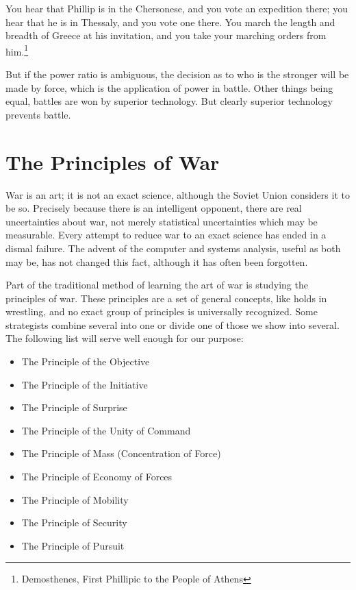 You hear that Phillip is in the Chersonese, and you vote an expedition there; you hear that he is in Thessaly, and you vote one there. You march the length and breadth of Greece at his invitation, and you take your marching orders from him.\footnote{Demosthenes, First Phillipic to the People of Athens}

But if the power ratio is ambiguous, the decision as to who is the stronger will be made by force, which is the application of power in battle. Other things being equal, battles are won by superior technology. But clearly superior technology prevents battle.

\section{The Principles of War}
War is an art; it is not an exact science, although the Soviet Union considers it to be so. Precisely because there is an intelligent opponent, there are real uncertainties about war, not merely statistical uncertainties which may be measurable. Every attempt to reduce war to an exact science has ended in a dismal failure. The advent of the computer and systems analysis, useful as both may be, has not changed this fact, although it has often been forgotten.

Part of the traditional method of learning the art of war is studying the principles of war. These principles are a set of general concepts, like holds in wrestling, and no exact group of principles is universally recognized. Some strategists combine several into one or divide one of those we show into several. The following list will serve well enough for our purpose:

\begin{itemize}
    \item The Principle of the Objective
    \item The Principle of the Initiative
    \item The Principle of Surprise
    \item The Principle of the Unity of Command
    \item The Principle of Mass (Concentration of Force)
    \item The Principle of Economy of Forces
    \item The Principle of Mobility
    \item The Principle of Security
    \item The Principle of Pursuit
\end{itemize}

